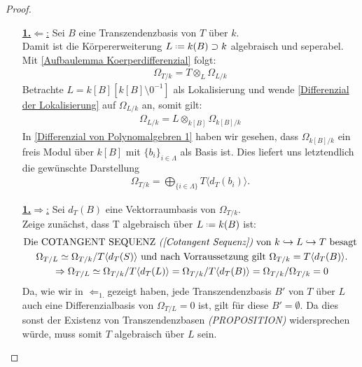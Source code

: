 \documentclass[10pt,a4paper]{report}
\newcommand{\comment}[1]{}
\newcommand{\divR}[2]{\Omega_{#1/#2}}
\newcommand{\divf}[1]{d_{#1}}
\newcommand{\Tensor}[3]{#1 \otimes_{#2} #3}
\newcommand{\lok}[2]{#1 [#2^{-1}]}
\newcommand*{\defeq}{\mathrel{\vcenter{\baselineskip0.5ex \lineskiplimit0pt
                     \hbox{\scriptsize.}\hbox{\scriptsize.}}}%
                     =}
\newcommand{\Verz}[1]{\langle #1 \rangle}
\begin{document}
\begin{proof}
\ \\
\begin{itemize}
\item[\underline{\textbf{1.}\glqq$\Leftarrow$\grqq:}] Sei $B$ eine Transzendenzbasis von $T$ über $k$.\\
Damit ist die Körpererweiterung $L \defeq k(B) \supset k$ algebraisch und seperabel. \comment{ mit \label{*Transzendenzbasisdef}} Mit \cref{Aufbaulemma Koerperdifferenzial} folgt:
\begin{gather*}
\divR{T}{k} = \Tensor{T}{L}{\divR{L}{k}}
\end{gather*}
Betrachte $L = \lok{k[B]}{k[B] \setminus 0}$ als Lokalisierung und wende \cref{Differenzial der Lokalisierung} auf $\divR{L}{k}$ an, somit gilt:
\begin{gather*}
\divR{L}{k} = \Tensor{L}{k[B]}{\divR{k[B]}{k}}
\end{gather*}
In \cref{Differenzial von Polynomalgebren 1} \comment{\label{*Differenzial von Polynomalgebren brauche ich für unendliche Mengen Lambda}} haben wir gesehen, dass $\divR{k[B]}{k}$ ein freis Modul über $k[B]$ mit $\lbrace b_i \rbrace_{i \in \Lambda}$ als Basis ist. Dies liefert uns letztendlich die gewünschte Darstellung
\begin{gather*}
\divR{T}{k} = \bigoplus_{\lbrace i \in \Lambda \rbrace} T \Verz{\divf{T}(b_i)}.
\end{gather*}
\item[\underline{\textbf{1.}\glqq$\Rightarrow$\grqq:}]Sei $\divf{T}(B)$ eine Vektorraumbasis von $\divR{T}{k}$.\\
Zeige zunächst, dass T algebraisch über $L \defeq k(B)$ ist:
\begin{gather*}
\text{Die COTANGENT SEQUENZ \textit{(\cref{Cotangent Sequenz})} von $k \hookrightarrow L \hookrightarrow T$ besagt }\\
\divR{T}{L} \simeq \divR{T}{k}/T \Verz{\divf{T}(S)} \text{ und nach Vorraussetzung gilt } \divR{T}{k} = T \Verz{\divf{T}(B)}.
\\
\Rightarrow \divR{T}{L} \simeq \divR{T}{k}/T\Verz{\divf{T}(L)} = \divR{T}{k}/T\Verz{\divf{T}(B)}=
\divR{T}{k}/\divR{T}{k} = 0
\end{gather*}
Da, wie wir in \glqq$\Leftarrow_{1.}$\grqq gezeigt haben, jede Transzendenzbasis $B'$ von $T$ über $L$ auch eine Differenzialbasis von $\divR{T}{L} = 0$ ist, gilt für diese $B' = \emptyset$. Da dies sonst der Existenz von Transzendenzbasen \textit{(PROPOSITION)} \comment{\label{*Transzendenzbasis existiert immer}} widersprechen würde, muss somit $T$ algebraisch über $L$ sein.\\

\end{itemize}
\end{proof}
\end{document}
